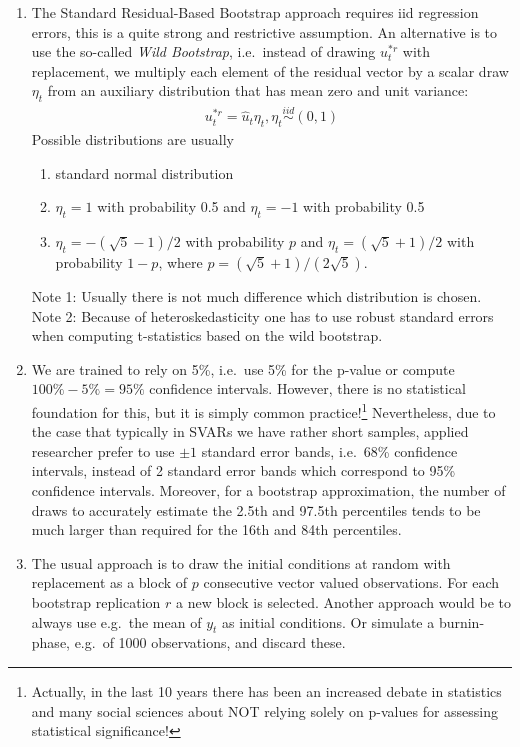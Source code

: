 \begin{enumerate}
\item The Standard Residual-Based Bootstrap approach requires iid regression errors, this is a quite strong and restrictive assumption.
An alternative is to use the so-called \emph{Wild Bootstrap}, i.e.\ instead of drawing \(u_{t}^{\ast r}\) with replacement,
  we multiply each element of the residual vector by a scalar draw \(\eta_t\) from an auxiliary distribution
that has mean zero and unit variance:
\begin{align*}
u_{t}^{\ast r} = \hat{u}_t \eta_t, \eta_t \overset{iid}{\sim}(0,1)
\end{align*}
Possible distributions are usually
\begin{enumerate}
\item standard normal distribution
\item \(\eta_t =1\) with probability 0.5 and \(\eta_t=-1\) with probability 0.5
\item \(\eta_t = -(\sqrt{5}-1)/2\) with probability $p$ and \(\eta_t = (\sqrt{5}+1)/2\) with probability \(1-p\),
  where \(p=(\sqrt{5}+1)/(2 \sqrt{5})\).
\end{enumerate}
Note 1: Usually there is not much difference which distribution is chosen.
\\
Note 2: Because of heteroskedasticity one has to use robust standard errors when computing t-statistics based on the wild bootstrap.

\item We are trained to rely on 5\%, i.e.\ use 5\% for the p-value or compute \(100\%-5\%=95\% \) confidence intervals.
However, there is no statistical foundation for this, but it is simply common practice!\footnote{%
  Actually, in the last 10 years there has been an increased debate in statistics
  and many social sciences about NOT relying solely on p-values for assessing statistical significance!}
Nevertheless, due to the case that typically in SVARs we have rather short samples,
  applied researcher prefer to use \(\pm 1\) standard error bands, i.e.\ 68\% confidence intervals,
  instead of 2 standard error bands which correspond to 95\% confidence intervals.
Moreover, for a bootstrap approximation, the number of draws to accurately estimate the 2.5th and 97.5th percentiles
  tends to be much larger than required for the 16th and 84th percentiles.

\item The usual approach is to draw the initial conditions at random with replacement as a block of \(p\) consecutive vector valued observations.
For each bootstrap replication \(r\) a new block is selected.
Another approach would be to always use e.g.\ the mean of \(y_t\) as initial conditions.
Or simulate a burnin-phase, e.g.\ of 1000 observations, and discard these.


\end{enumerate}
